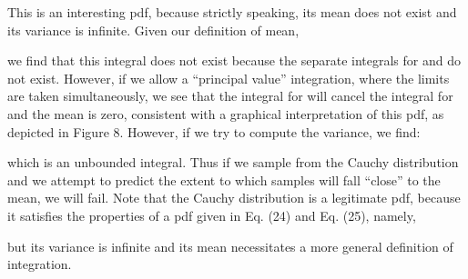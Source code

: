  

This is an interesting pdf, because strictly speaking, its mean does not exist and its variance is infinite. Given our definition of mean,

 

we find that this integral does not exist because the separate integrals for   and  do not exist. However, if we allow a ``principal value'' integration, where the limits are taken simultaneously, we see that the integral for  will cancel the integral for  and the mean is zero, consistent with a graphical interpretation of this pdf, as depicted in Figure 8. However, if we try to compute the variance, we find:

 

which is an unbounded integral. Thus if we sample from the Cauchy distribution and we attempt to predict the extent to which samples will fall ``close'' to the mean, we will fail. Note that the Cauchy distribution is a legitimate pdf, because it satisfies the properties of a pdf given in Eq. (24) and Eq. (25), namely,





but its variance is infinite and its mean necessitates a more general definition of integration.




